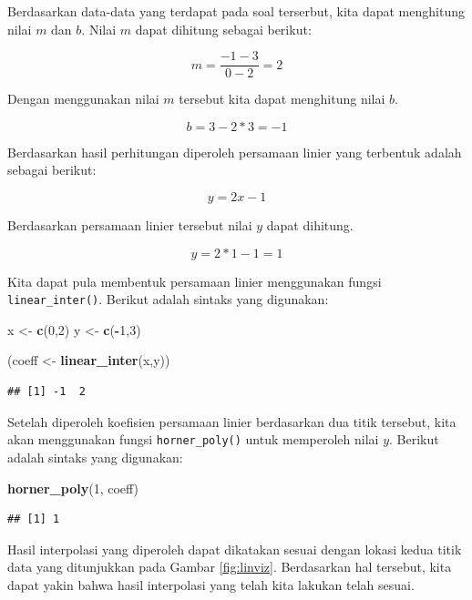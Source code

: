 \documentclass[
]{book}
\newenvironment{Shaded}{\begin{snugshade}}{\end{snugshade}}
\newcommand{\DecValTok}[1]{\textcolor[rgb]{0.00,0.00,0.81}{#1}}
\newcommand{\FunctionTok}[1]{\textcolor[rgb]{0.13,0.29,0.53}{\textbf{#1}}}
\newcommand{\NormalTok}[1]{#1}
\newcommand{\OtherTok}[1]{\textcolor[rgb]{0.56,0.35,0.01}{#1}}
\newcommand{\SpecialCharTok}[1]{\textcolor[rgb]{0.81,0.36,0.00}{\textbf{#1}}}
\theoremstyle{definition}
\theoremstyle{definition}
\theoremstyle{definition}
\theoremstyle{definition}
\theoremstyle{remark}
\begin{document}
Berdasarkan data-data yang terdapat pada soal terserbut, kita dapat menghitung nilai \(m\) dan \(b\). Nilai \(m\) dapat dihitung sebagai berikut:

\[
m=\frac{-1-3}{0-2}=2
\]

Dengan menggunakan nilai \(m\) tersebut kita dapat menghitung nilai \(b\).

\[
b=3-2*3=-1
\]

Berdasarkan hasil perhitungan diperoleh persamaan linier yang terbentuk adalah sebagai berikut:

\[
y=2x-1
\]

Berdasarkan persamaan linier tersebut nilai \(y\) dapat dihitung.

\[
y=2*1-1=1
\]

Kita dapat pula membentuk persamaan linier menggunakan fungsi \texttt{linear\_inter()}. Berikut adalah sintaks yang digunakan:

\begin{Shaded}
\begin{Highlighting}[]
\NormalTok{x }\OtherTok{\textless{}{-}} \FunctionTok{c}\NormalTok{(}\DecValTok{0}\NormalTok{,}\DecValTok{2}\NormalTok{)}
\NormalTok{y }\OtherTok{\textless{}{-}} \FunctionTok{c}\NormalTok{(}\SpecialCharTok{{-}}\DecValTok{1}\NormalTok{,}\DecValTok{3}\NormalTok{)}

\NormalTok{(coeff }\OtherTok{\textless{}{-}} \FunctionTok{linear\_inter}\NormalTok{(x,y))}
\end{Highlighting}
\end{Shaded}

\begin{verbatim}
## [1] -1  2
\end{verbatim}

Setelah diperoleh koefisien persamaan linier berdasarkan dua titik tersebut, kita akan menggunakan fungsi \texttt{horner\_poly()} untuk memperoleh nilai \(y\). Berikut adalah sintaks yang digunakan:

\begin{Shaded}
\begin{Highlighting}[]
\FunctionTok{horner\_poly}\NormalTok{(}\DecValTok{1}\NormalTok{, coeff)}
\end{Highlighting}
\end{Shaded}

\begin{verbatim}
## [1] 1
\end{verbatim}

Hasil interpolasi yang diperoleh dapat dikatakan sesuai dengan lokasi kedua titik data yang ditunjukkan pada Gambar \ref{fig:linviz}. Berdasarkan hal tersebut, kita dapat yakin bahwa hasil interpolasi yang telah kita lakukan telah sesuai.
\end{document}
